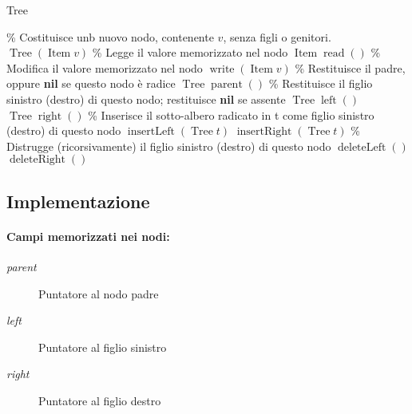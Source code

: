         \begin{algorithm}[H]
            \caption{Tree}
            \% Costituisce unb nuovo nodo, contenente $v$, senza figli o genitori. \newline
            $\operatorname{Tree}(\operatorname{Item} v) $ \newline
            \% Legge il valore memorizzato nel nodo \newline
            $\operatorname{Item} \operatorname{read}()$ \newline
            \% Modifica il valore memorizzato nel nodo \newline
            $\operatorname{write}(\operatorname{Item} v)$ \newline
            \% Restituisce il padre, oppure \textbf{nil} se questo nodo è radice \newline
            $\operatorname{Tree} \operatorname{parent}() $ \newline
            \% Restituisce il figlio sinistro (destro) di questo nodo; restituisce \textbf{nil} se assente
            $\operatorname{Tree} \operatorname{left}()$ \newline
            $\operatorname{Tree} \operatorname{right}()$ \newline
            \% Inserisce il sotto-albero radicato in t come figlio sinistro (destro) di questo nodo\newline
            $\operatorname{insertLeft}(\operatorname{Tree} t)$ \newline
            $\operatorname{insertRight}(\operatorname{Tree} t) $\newline
            \% Distrugge (ricorsivamente) il figlio sinistro (destro) di questo nodo \newline
            $\operatorname{deleteLeft}()$ \newline
            $\operatorname{deleteRight}()$
        \end{algorithm}
    \subsection{Implementazione}
        \paragraph{Campi memorizzati nei nodi:}\begin{description}
            \item[\textit{parent}] Puntatore al nodo padre
            \item[\textit{left}] Puntatore al figlio sinistro
            \item[\textit{right}] Puntatore al figlio destro
        \end{description}
